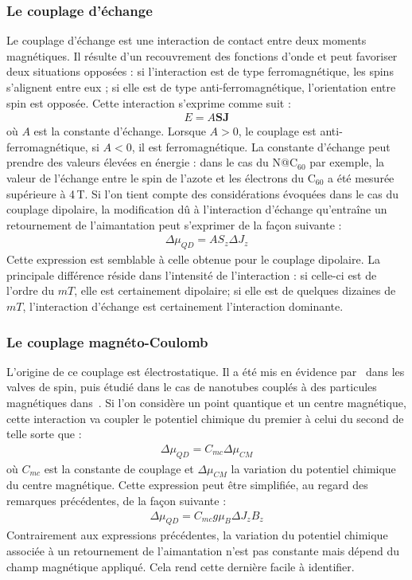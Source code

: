 \subsubsection{Le couplage d'échange}
Le couplage d'échange est une interaction de contact entre deux moments magnétiques. Il résulte d'un recouvrement des fonctions d'onde et peut favoriser deux situations opposées : si l'interaction est de type ferromagnétique, les spins s'alignent entre eux ; si elle est de type anti-ferromagnétique, l'orientation entre spin est opposée. Cette interaction s'exprime comme suit :
\begin{eqnarray}
E = A\mathbf{SJ} \nonumber
\end{eqnarray}
où $A$ est la constante d'échange. Lorsque $A>0$, le couplage est anti-ferromagnétique, si $A<0$, il est ferromagnétique. La constante d'échange peut prendre des valeurs élevées en énergie : dans le cas du N@C$_{60}$ par exemple, la valeur de l'échange entre le spin de l'azote et les électrons du C$_{60}$ a été mesurée supérieure à 4\,T. Si l'on tient compte des considérations évoquées dans le cas du couplage dipolaire, la modification d\^u à l'interaction d'échange qu’entraîne un retournement de l'aimantation peut s'exprimer de la façon suivante :
\begin{eqnarray}
\Delta \mu_{QD} = AS_z\Delta J_z\nonumber
\end{eqnarray}
Cette expression est semblable à celle obtenue pour le couplage dipolaire. La principale différence réside dans l'intensité de l'interaction : si celle-ci est de l'ordre du $mT$, elle est certainement dipolaire; si elle est de quelques dizaines de $mT$, l'interaction d'échange est certainement l'interaction dominante.

\subsubsection{Le couplage magnéto-Coulomb}
L'origine de ce couplage est électrostatique. Il a été mis en évidence par~\cite{Molen2006} dans les valves de spin, puis étudié dans le cas de nanotubes couplés à des particules magnétiques dans~\cite{Datta2011}. Si l'on considère un point quantique et un centre magnétique, cette interaction va coupler le potentiel chimique du premier à celui du second de telle sorte que :
\begin{eqnarray}
\Delta \mu_{QD} = C_{mc} \Delta \mu_{CM}
\end{eqnarray}
où $C_{mc}$ est la constante de couplage et $\Delta \mu_{CM}$ la variation du potentiel chimique du centre magnétique. Cette expression peut être simplifiée, au regard des remarques précédentes, de la façon suivante :
\begin{eqnarray}
\Delta \mu_{QD} = C_{mc} g \mu_B  \Delta J_z B_z
\end{eqnarray}
Contrairement aux expressions précédentes, la variation du potentiel chimique associée à un retournement de l'aimantation n'est pas constante mais dépend du champ magnétique appliqué. Cela rend cette dernière facile à identifier.


